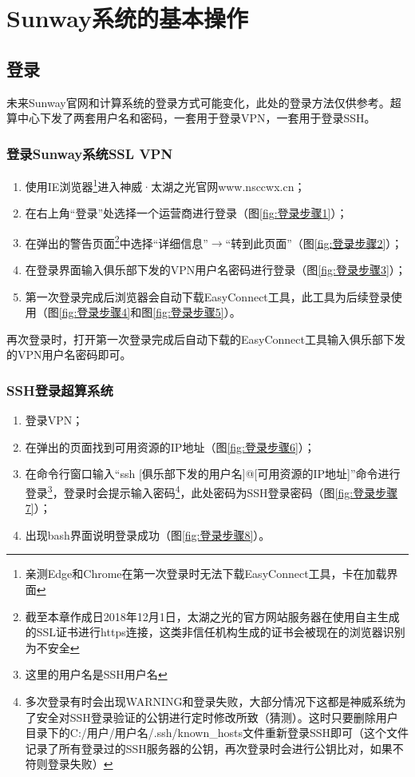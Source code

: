 \chapter{Sunway系统的基本操作}\label{chap:introduction}

\section{登录}

未来Sunway官网和计算系统的登录方式可能变化，此处的登录方法仅供参考。超算中心下发了两套用户名和密码，一套用于登录VPN，一套用于登录SSH。

\subsection{登录Sunway系统SSL VPN}
\begin{enumerate}
	\item 使用IE浏览器\footnote{亲测Edge和Chrome在第一次登录时无法下载EasyConnect工具，卡在加载界面}进入神威·太湖之光官网www.nsccwx.cn；
	\item 在右上角“登录”处选择一个运营商进行登录（图\ref{fig:登录步骤1}）；
	\item 在弹出的警告页面\footnote{截至本章作成日2018年12月1日，太湖之光的官方网站服务器在使用自主生成的SSL证书进行https连接，这类非信任机构生成的证书会被现在的浏览器识别为不安全}中选择“详细信息”$\rightarrow$“转到此页面”（图\ref{fig:登录步骤2}）；
	\item 在登录界面输入俱乐部下发的VPN用户名密码进行登录（图\ref{fig:登录步骤3}）；
	\item 第一次登录完成后浏览器会自动下载EasyConnect工具，此工具为后续登录使用（图\ref{fig:登录步骤4}和图\ref{fig:登录步骤5}）。
\end{enumerate}

再次登录时，打开第一次登录完成后自动下载的EasyConnect工具输入俱乐部下发的VPN用户名密码即可。

\subsection{SSH登录超算系统}
\begin{enumerate}
	\item 登录VPN；
	\item 在弹出的页面找到可用资源的IP地址（图\ref{fig:登录步骤6}）；
	\item 在命令行窗口输入“ssh [俱乐部下发的用户名]@[可用资源的IP地址]”命令进行登录\footnote{这里的用户名是SSH用户名}，登录时会提示输入密码\footnote{多次登录有时会出现WARNING和登录失败，大部分情况下这都是神威系统为了安全对SSH登录验证的公钥进行定时修改所致（猜测）。这时只要删除用户目录下的C:/用户/用户名/.ssh/known\_hosts文件重新登录SSH即可（这个文件记录了所有登录过的SSH服务器的公钥，再次登录时会进行公钥比对，如果不符则登录失败）}，此处密码为SSH登录密码（图\ref{fig:登录步骤7}）；
	\item 出现bash界面说明登录成功（图\ref{fig:登录步骤8}）。
\end{enumerate}

